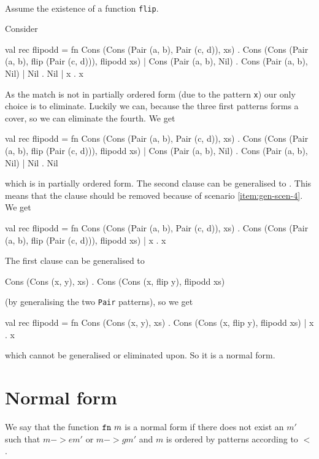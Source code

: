 \begin{example}[Generalisation, $->g$]\ \\
Assume the existence of a function \texttt{flip}.

Consider

\begin{sml}
val rec flipodd =
fn Cons (Cons (Pair (a, b), Pair (c, d)), xs) .
     Cons (Cons (Pair (a, b), flip (Pair (c, d))), flipodd xs)
 | Cons (Pair (a, b), Nil) . Cons (Pair (a, b), Nil)
 | Nil . Nil
 | x . x
\end{sml}

As the match is not in partially ordered form (due to the pattern \texttt{x})
our only choice is to eliminate. Luckily we can, because the three first
patterns forms a cover, so we can eliminate the fourth. We get
\begin{sml}
val rec flipodd =
fn Cons (Cons (Pair (a, b), Pair (c, d)), xs) .
     Cons (Cons (Pair (a, b), flip (Pair (c, d))), flipodd xs)
 | Cons (Pair (a, b), Nil) . Cons (Pair (a, b), Nil)
 | Nil . Nil
\end{sml}
which is in partially ordered form. The second clause can be generalised to
. This means that the clause  should be removed
because of scenario \ref{item:gen-scen-4}. We get
\begin{sml}
val rec flipodd =
fn Cons (Cons (Pair (a, b), Pair (c, d)), xs) .
     Cons (Cons (Pair (a, b), flip (Pair (c, d))), flipodd xs)
 | x . x
\end{sml}
The first clause can be generalised to

\begin{sml}
Cons (Cons (x, y), xs) . Cons (Cons (x, flip y), flipodd xs)
\end{sml}
\noindent (by generalising the two \texttt{Pair} patterns), so we get

\begin{sml}
val rec flipodd =
fn Cons (Cons (x, y), xs) .
     Cons (Cons (x, flip y), flipodd xs)
 | x . x
\end{sml}
which cannot be generalised or eliminated upon. So it is a normal form.

\end{example}

\section{Normal form}
We say that the function $\texttt{fn}\  m$ is a normal form if there does not exist an
$m'$ such that $m ->e m'$ or $m ->g m'$ and $m$ is ordered by patterns according
to $<$.

